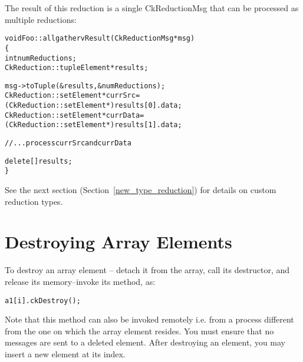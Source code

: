 The result of this reduction is a single CkReductionMsg that can be processed
as multiple reductions:

\begin{alltt}
void Foo::allgathervResult (CkReductionMsg* msg)
\{
  int numReductions;
  CkReduction::tupleElement* results;

  msg->toTuple(\&results, \&numReductions);
  CkReduction::setElement* currSrc  = (CkReduction::setElement*)results[0].data;
  CkReduction::setElement* currData = (CkReduction::setElement*)results[1].data;

  // ... process currSrc and currData

  delete [] results;
\}
\end{alltt}

See the next section (Section~\ref{new_type_reduction}) for details on
custom reduction types.

\section{Destroying Array Elements}

To destroy an array element -- detach it from the array,
call its destructor, and release its memory--invoke its 
 method, as:

\begin{alltt}
a1[i].ckDestroy();
\end{alltt}

Note that this method can also be invoked remotely i.e. from 
a process different from the one on which the array element resides.
You must ensure that no messages are sent to a deleted element. 
After destroying an element, you may insert a new element at
its index. 
